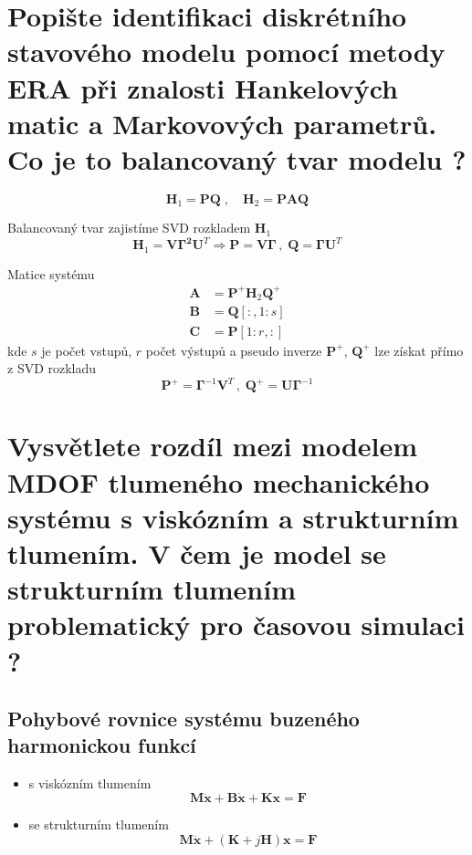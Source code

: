 \documentclass{article}
\begin{document}
	\section{Popište identifikaci diskrétního stavového modelu pomocí metody ERA při znalosti Hankelových matic a Markovových parametrů. Co je to balancovaný tvar modelu ? }

	\begin{equation}
		\bm{H}_1 = \bm{P}\bm{Q}
		\;,\quad 
		\bm{H}_2 = \bm{P}\bm{A}\bm{Q}
	\end{equation}

	Balancovaný tvar zajistíme SVD rozkladem $\bm{H}_1$
	\begin{equation}
		\bm{H}_1 = \bm{V}\bm{\Gamma^2}\bm{U}^T
		\Rightarrow
		\bm{P} = \bm{V}\bm{\Gamma} \,,\; \bm{Q} = \bm{\Gamma}\bm{U}^T
	\end{equation}

	Matice systému
	\begin{align}
		\bm{A} &= \bm{P}^+ \bm{H}_2 \bm{Q}^+ \\
		\bm{B} &= \bm{Q}[:,1:s] \\
		\bm{C} &= \bm{P}[1:r,:]
	\end{align}
	kde $s$ je počet vstupů, $r$ počet výstupů a pseudo inverze $\bm{P}^+$, $\bm{Q}^+$ lze získat přímo z SVD rozkladu
	\begin{equation}
		\bm{P}^+ = \bm{\Gamma}^{-1}\bm{V}^T
		\,,\;
		\bm{Q}^+ = \bm{U}\bm{\Gamma}^{-1}
	\end{equation}


	\section{Vysvětlete rozdíl mezi modelem MDOF tlumeného mechanického systému s viskózním a strukturním tlumením. V čem je model se strukturním tlumením problematický pro časovou simulaci ? }

	\subsection*{Pohybové rovnice systému buzeného harmonickou funkcí}
	\begin{itemize}
		\item s viskózním tlumením
		\begin{equation}
			\bm{M}\bm{\ddot{x}} + \bm{B}\bm{\dot{x}} + \bm{K}\bm{x} = \bm{F}
		\end{equation}
		\item se strukturním tlumením
		\begin{equation}
			\bm{M}\bm{\ddot{x}} + (\bm{K} + j\bm{H}) \bm{x} = \bm{F}
		\end{equation}
	\end{itemize}
\end{document}
